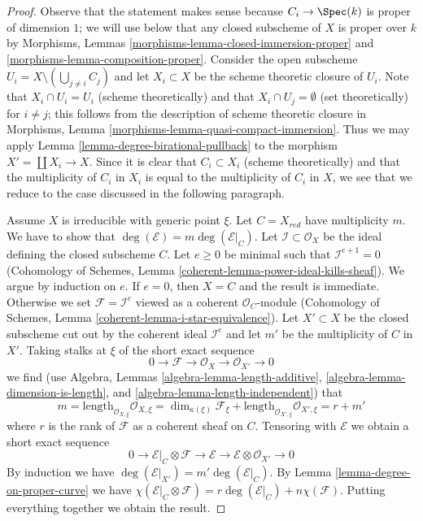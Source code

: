 \begin{proof}
Observe that the statement makes sense because $C_i \to \Spec(k)$
is proper of dimension $1$; we will use below that any closed subscheme
of $X$ is proper over $k$ by Morphisms, Lemmas
\ref{morphisms-lemma-closed-immersion-proper} and
\ref{morphisms-lemma-composition-proper}. Consider the open subscheme
$U_i = X \setminus (\bigcup_{j \not = i} C_j)$ and let $X_i \subset X$
be the scheme theoretic closure of $U_i$. Note that $X_i \cap U_i = U_i$
(scheme theoretically) and that $X_i \cap U_j = \emptyset$
(set theoretically) for $i \not = j$; this follows from the description
of scheme theoretic closure in
Morphisms, Lemma \ref{morphisms-lemma-quasi-compact-immersion}.
Thus we may apply Lemma \ref{lemma-degree-birational-pullback} to the morphism
$X' = \coprod X_i \to X$. Since it is clear that $C_i \subset X_i$
(scheme theoretically) and that the multiplicity of $C_i$ in $X_i$ is equal
to the multiplicity of $C_i$ in $X$, we see that we reduce to the case
discussed in the following paragraph.

\medskip\noindent
Assume $X$ is irreducible with generic point $\xi$. Let
$C = X_{red}$ have multiplicity $m$.
We have to show that $\deg(\mathcal{E}) = m \deg(\mathcal{E}|_C)$.
Let $\mathcal{I} \subset \mathcal{O}_X$ be the ideal defining the closed
subscheme $C$. Let $e \geq 0$ be minimal such that $\mathcal{I}^{e + 1} = 0$
(Cohomology of Schemes, Lemma \ref{coherent-lemma-power-ideal-kills-sheaf}).
We argue by induction on $e$. If $e = 0$, then $X = C$ and the result
is immediate. Otherwise we set $\mathcal{F} = \mathcal{I}^e$ viewed as
a coherent $\mathcal{O}_C$-module (Cohomology of Schemes, Lemma
\ref{coherent-lemma-i-star-equivalence}).
Let $X' \subset X$ be the closed subscheme cut out by the
coherent ideal $\mathcal{I}^e$ and let $m'$ be the multiplicity
of $C$ in $X'$. Taking stalks at $\xi$ of the short exact sequence
$$
0 \to \mathcal{F} \to \mathcal{O}_X \to \mathcal{O}_{X'} \to 0
$$
we find (use Algebra, Lemmas \ref{algebra-lemma-length-additive},
\ref{algebra-lemma-dimension-is-length}, and
\ref{algebra-lemma-length-independent}) that
$$
m = \text{length}_{\mathcal{O}_{X, \xi}} \mathcal{O}_{X, \xi}
= \dim_{\kappa(\xi)} \mathcal{F}_\xi +
\text{length}_{\mathcal{O}_{X', \xi}} \mathcal{O}_{X', \xi}
= r + m'
$$
where $r$ is the rank of $\mathcal{F}$ as a coherent sheaf on $C$.
Tensoring with $\mathcal{E}$ we obtain a short exact sequence
$$
0 \to \mathcal{E}|_C \otimes \mathcal{F} \to \mathcal{E} \to
\mathcal{E} \otimes \mathcal{O}_{X'} \to 0
$$
By induction we have
$\deg(\mathcal{E}|_{X'}) = m' \deg(\mathcal{E}|_C)$.
By Lemma \ref{lemma-degree-on-proper-curve} we have
$\chi(\mathcal{E}|_C \otimes \mathcal{F}) =
r \deg(\mathcal{E}|_C) + n \chi(\mathcal{F})$.
Putting everything together we obtain the result.
\end{proof}

